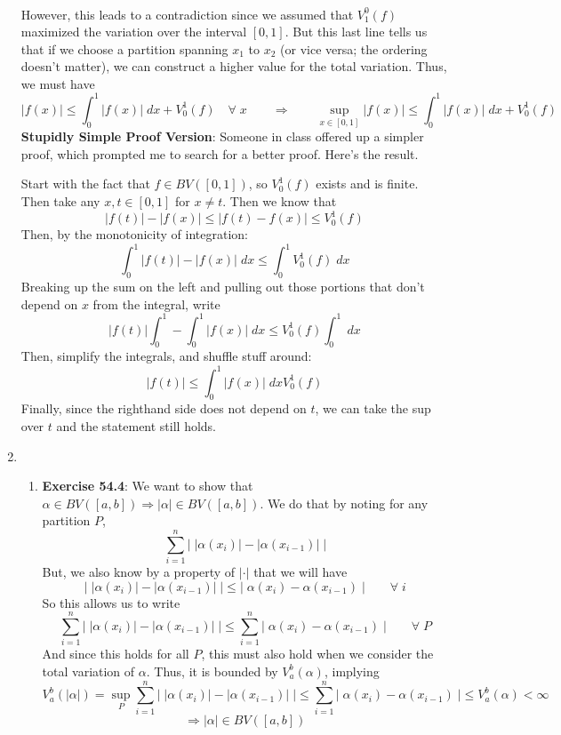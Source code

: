 \documentclass[12pt]{article}
\theoremstyle{plain}
\theoremstyle{definition}
\theoremstyle{remark}
\begin{document}
\begin{enumerate}
\begin{align}
\end{align}
However, this leads to a contradiction since we assumed that $V_1^0(f)$ maximized the variation over the interval $[0,1]$.  But this last line tells us that if we choose a partition spanning $x_1$ to $x_2$ (or vice versa; the ordering doesn't matter), we can construct a higher value for the total variation. Thus, we must have 
\[ 
    |f(x)| \leq \int^1_0 |f(x)|\;dx
    + V^1_0(f) \quad \forall\; x
    \qquad \Rightarrow \qquad
    \sup_{x\in[0,1]} |f(x)| \leq \int^1_0 |f(x)|\;dx
    + V^1_0(f) 
\]
\textbf{Stupidly Simple Proof Version}: Someone in class offered up a simpler proof, which prompted me to search for a better proof. Here's the result.

Start with the fact that $f\in BV([0,1])$, so $V^1_0(f)$ exists and is finite. Then take any $x,t \in [0,1]$ for $x\neq t$. Then we know that
\[
    |f(t)| - |f(x)| \leq |f(t) -f(x)| \leq V^1_0(f) 
\]
Then, by the monotonicity of integration:
\[
    \int^1_0 |f(t)| - |f(x)| \; dx\leq \int^1_0 
        V^1_0(f) \; dx
\]
Breaking up the sum on the left and pulling out those portions that don't depend on $x$ from the integral, write
\[
    |f(t)|\int^1_0  - \int^1_0|f(x)| \; dx\leq  
        V^1_0(f) \int^1_0\; dx
\]
Then, simplify the integrals, and shuffle stuff around:
\[
    |f(t)|  \leq  \int^1_0|f(x)| \; dx
        V^1_0(f)
\]
Finally, since the righthand side does not depend on $t$, we can take the sup over $t$ and the statement still holds.


\item 
\begin{enumerate} 
\item \textbf{Exercise 54.4}: We want to show that $\alpha\in BV([a,b]) \Rightarrow |\alpha|\in BV([a,b])$. We do that by noting for any partition $P$, 
\[ 
    \sum^n_{i=1} \left\lvert \;|\alpha(x_{i})| - |\alpha(x_{i-1})|
    \;\right\rvert 
\]
But, we also know by a property of $|\cdot|$ that we will have
\[ 
    \left\lvert \;|\alpha(x_{i})| - |\alpha(x_{i-1})|\;
    \right\rvert \leq 
    \left\lvert \;\alpha(x_{i}) - \alpha(x_{i-1})\;
    \right\rvert  \qquad \forall\; i
\]
So this allows us to write
\[ 
    \sum^n_{i=1} \left\lvert \;|\alpha(x_{i})| - |\alpha(x_{i-1})|
    \;\right\rvert 
    \leq 
    \sum^n_{i=1} 
    \left\lvert \;\alpha(x_{i}) - \alpha(x_{i-1})\;
    \right\rvert  \qquad \forall \; P
\]
And since this holds for all $P$, this must also hold when we consider the total variation of $\alpha$.  Thus, it is bounded by $V_a^b(\alpha)$, implying
\[ 
    V_a^b(|\alpha|) = \sup_P
    \sum^n_{i=1} \left\lvert \;|\alpha(x_{i})| - |\alpha(x_{i-1})|
    \;\right\rvert 
    \leq 
    \sum^n_{i=1} 
    \left\lvert \;\alpha(x_{i}) - \alpha(x_{i-1})\;
    \right\rvert \leq V_a^b(\alpha) < \infty
\]
\[ 
    \Rightarrow |\alpha|\in BV([a,b])
\]


\end{enumerate}
\end{enumerate}
\end{document}
